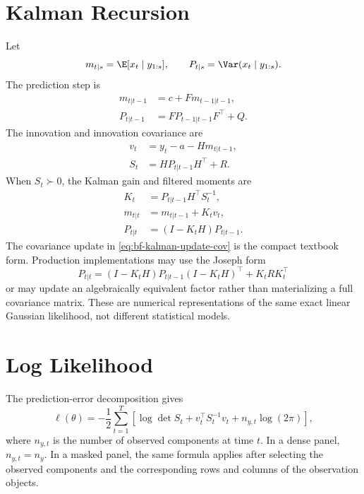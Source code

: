 \section{Kalman Recursion}
\label{sec:bf-kalman-recursion}

Let
\[
  m_{t|s}=\E[x_t\mid y_{1:s}], \qquad
  P_{t|s}=\Var(x_t\mid y_{1:s}).
\]
The prediction step is
\begin{align}
  m_{t|t-1} &= c + Fm_{t-1|t-1}, \label{eq:bf-kalman-pred-mean}\\
  P_{t|t-1} &= FP_{t-1|t-1}F^\top + Q. \label{eq:bf-kalman-pred-cov}
\end{align}
The innovation and innovation covariance are
\begin{align}
  v_t &= y_t-a-Hm_{t|t-1}, \label{eq:bf-innovation}\\
  S_t &= HP_{t|t-1}H^\top + R. \label{eq:bf-innovation-cov}
\end{align}
When $S_t\succ 0$, the Kalman gain and filtered moments are
\begin{align}
  K_t &= P_{t|t-1}H^\top S_t^{-1}, \label{eq:bf-kalman-gain}\\
  m_{t|t} &= m_{t|t-1}+K_tv_t, \label{eq:bf-kalman-update-mean}\\
  P_{t|t} &= (I-K_tH)P_{t|t-1}. \label{eq:bf-kalman-update-cov}
\end{align}
The covariance update in \eqref{eq:bf-kalman-update-cov} is the compact
textbook form.  Production implementations may use the Joseph form
\[
  P_{t|t}
  =
  (I-K_tH)P_{t|t-1}(I-K_tH)^\top + K_t R K_t^\top
\]
or may update an algebraically equivalent factor rather than materializing a
full covariance matrix.  These are numerical representations of the same
exact linear Gaussian likelihood, not different statistical models.

\section{Log Likelihood}
\label{sec:bf-ped-loglik}

The prediction-error decomposition gives
\begin{equation}
\label{eq:bf-ped-loglik}
  \ell(\theta)
  =
  -\frac{1}{2}\sum_{t=1}^T
  \left[
    \log\det S_t
    + v_t^\top S_t^{-1}v_t
    + n_{y,t}\log(2\pi)
  \right],
\end{equation}
where $n_{y,t}$ is the number of observed components at time $t$.  In a dense
panel, $n_{y,t}=n_y$.  In a masked panel, the same formula applies after
selecting the observed components and the corresponding rows and columns of the
observation objects.

